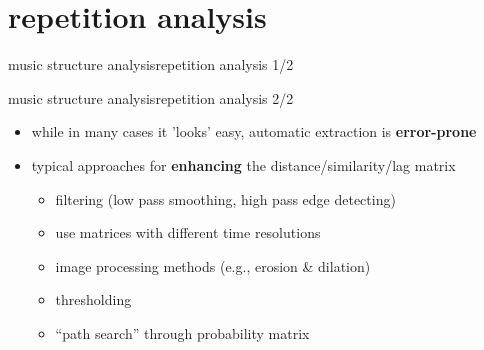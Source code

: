     \section[repetition]{repetition analysis}%
        \begin{frame}{music structure analysis}{repetition analysis 1/2}
            \vspace{-4mm}
        \end{frame}
        \begin{frame}{music structure analysis}{repetition analysis 2/2}
            \begin{itemize}
                \item   while in many cases it 'looks' easy, automatic extraction is \textbf{error-prone}
                \bigskip
                \item<2->[$\Rightarrow$]   typical approaches for \textbf{enhancing} the distance/similarity/lag matrix
                    \begin{itemize}
                        \item   filtering (low pass smoothing, high pass edge detecting)
                        \item   use matrices with different time resolutions
                        \item   image processing methods (e.g., erosion \& dilation)
                        \item   thresholding
                        \item   ``path search'' through probability matrix
                    \end{itemize}
            \end{itemize}
        \end{frame}
